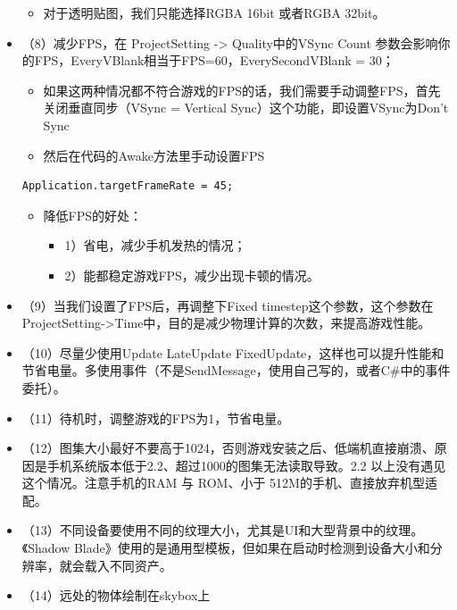 \documentclass[9pt, b5paper]{article}
\begin{document}
\begin{itemize}
\begin{itemize}
\item 对于透明贴图，我们只能选择RGBA 16bit 或者RGBA 32bit。
\end{itemize}
\item （8）减少FPS，在 ProjectSetting -> Quality中的VSync Count 参数会影响你的FPS，EveryVBlank相当于FPS=60，EverySecondVBlank = 30；
\begin{itemize}
\item 如果这两种情况都不符合游戏的FPS的话，我们需要手动调整FPS，首先关闭垂直同步（VSync = Vertical Sync）这个功能，即设置VSync为Don't Sync
\item 然后在代码的Awake方法里手动设置FPS
\end{itemize}
\begin{verbatim}
Application.targetFrameRate = 45;
\end{verbatim}
\begin{itemize}
\item 降低FPS的好处：
\begin{itemize}
\item 1）省电，减少手机发热的情况；
\item 2）能都稳定游戏FPS，减少出现卡顿的情况。
\end{itemize}
\end{itemize}
\item （9）当我们设置了FPS后，再调整下Fixed timestep这个参数，这个参数在ProjectSetting->Time中，目的是减少物理计算的次数，来提高游戏性能。
\item （10）尽量少使用Update LateUpdate FixedUpdate，这样也可以提升性能和节省电量。多使用事件（不是SendMessage，使用自己写的，或者C\#中的事件委托）。
\item （11）待机时，调整游戏的FPS为1，节省电量。
\item （12）图集大小最好不要高于1024，否则游戏安装之后、低端机直接崩溃、原因是手机系统版本低于2.2、超过1000的图集无法读取导致。2.2 以上没有遇见这个情况。注意手机的RAM 与 ROM、小于 512M的手机、直接放弃机型适配。
\item （13）不同设备要使用不同的纹理大小，尤其是UI和大型背景中的纹理。《Shadow Blade》使用的是通用型模板，但如果在启动时检测到设备大小和分辨率，就会载入不同资产。
\item （14）远处的物体绘制在skybox上
\end{itemize}
\end{document}
